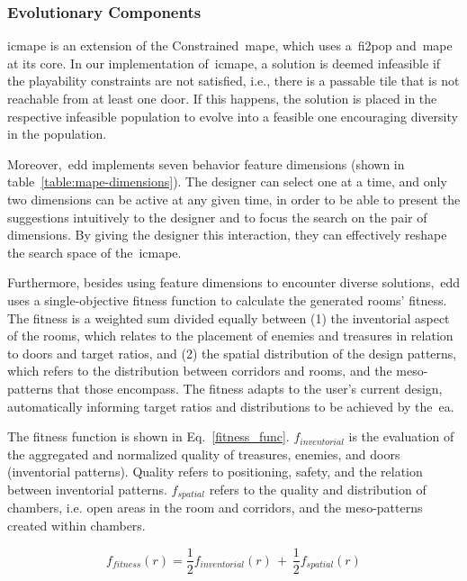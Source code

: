 \subsubsection{Evolutionary Components}

\acrshort{icmape} is an extension of the Constrained~\acrshort{mape}, which uses a~\acrshort{fi2pop} and~\acrshort{mape} at its core. In our implementation of~\acrshort{icmape}, a solution is deemed infeasible if the playability constraints are not satisfied, i.e., there is a passable tile that is not reachable from at least one door. If this happens, the solution is placed in the respective infeasible population to evolve into a feasible one encouraging diversity in the population.

Moreover,~\acrshort{edd} implements seven behavior feature dimensions (shown in table~\ref{table:mape-dimensions}). The designer can select one at a time, and only two dimensions can be active at any given time, in order to be able to present the suggestions intuitively to the designer and to focus the search on the pair of dimensions. By giving the designer this interaction, they can effectively reshape the search space of the~\acrshort{icmape}.

Furthermore, besides using feature dimensions to encounter diverse solutions,~\acrshort{edd} uses a single-objective fitness function to calculate the generated rooms' fitness. The fitness is a weighted sum divided equally between (1) the inventorial aspect of the rooms, which relates to the placement of enemies and treasures in relation to doors and target ratios, and (2) the spatial distribution of the design patterns, which refers to the distribution between corridors and rooms, and the meso-patterns that those encompass. The fitness adapts to the user's current design, automatically informing target ratios and distributions to be achieved by the~\acrshort{ea}.

The fitness function is shown in Eq.~\ref{fitness_func}. $f_{inventorial}$ is the evaluation of the aggregated and normalized quality of treasures, enemies, and doors (inventorial patterns). Quality refers to positioning, safety, and the relation between inventorial patterns. $f_{spatial}$ refers to the quality and distribution of chambers, i.e. open areas in the room and corridors, and the meso-patterns created within chambers. 

\begin{equation} 
\label{fitness_func}
f_{fitness}(r) = \frac{1}{2}f_{inventorial}(r) \,+ \, \frac{1}{2}f_{spatial}(r)
\end{equation}



